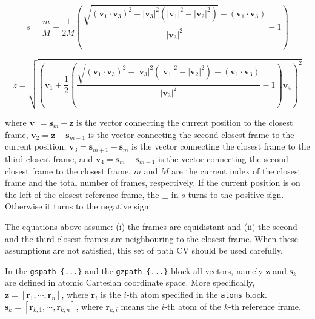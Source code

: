 \begin{equation}
s = \frac{m}{M} \pm \frac{1}{2M} \left( \frac{\sqrt{(\mathbf{v}_1 \cdot \mathbf{v}_3)^2-|\mathbf{v}_3|^2 (|\mathbf{v}_1|^2 - |\mathbf{v}_2|^2)}-(\mathbf{v}_1 \cdot \mathbf{v}_3)}{|\mathbf{v}_3|^2} -1 \right)
\end{equation}

\begin{equation}
z = \sqrt{\left(\mathbf{v}_1 + \frac{1}{2}\left(\frac{\sqrt{(\mathbf{v}_1 \cdot \mathbf{v}_3)^2-|\mathbf{v}_3|^2 (|\mathbf{v}_1|^2 - |\mathbf{v}_2|^2)}-(\mathbf{v}_1 \cdot \mathbf{v}_3)}{|\mathbf{v}_3|^2} -1 \right)\mathbf{v}_4 \right)^2}
\end{equation}

where $\mathbf{v}_1 = \mathbf{s}_{m} - \mathbf{z} $ is the vector connecting the current position to the closest frame, $\mathbf{v}_2 = \mathbf{z} - \mathbf{s}_{m-1}$ is the vector connecting the second closest frame to the current position, $\mathbf{v}_3 = \mathbf{s}_{m+1} - \mathbf{s}_{m}$ is the vector connecting the closest frame to the third closest frame, and $\mathbf{v}_4 = \mathbf{s}_m - \mathbf{s}_{m-1}$ is the vector connecting the second closest frame to the closest frame. $m$ and $M$ are the current index of the closest frame and the total number of frames, respectively. If the current position is on the left of the closest reference frame, the $\pm$ in $s$ turns to the positive sign. Otherwise it turns to the negative sign.

The equations above assume: (i) the frames are equidistant and (ii) the second and the third closest frames are neighbouring to the closest frame. When these assumptions are not satisfied, this set of path CV should be used carefully.


In the \texttt{gspath~\{...\}} and the \texttt{gzpath~\{...\}} block all vectors, namely $\mathbf{z}$ and $\mathbf{s}_{k}$ are defined in atomic Cartesian coordinate space. More specifically, $\mathbf{z} = \left[\mathbf{r}_{1}, \cdots, \mathbf{r}_{n}\right]$, where $\mathbf{r}_{i}$ is the $i$-th atom specified in the \texttt{atoms} block. $\mathbf{s}_{k} = \left[\mathbf{r}_{k,1}, \cdots, \mathbf{r}_{k,n}\right]$, where $\mathbf{r}_{k,i}$ means the $i$-th atom of the $k$-th reference frame.

